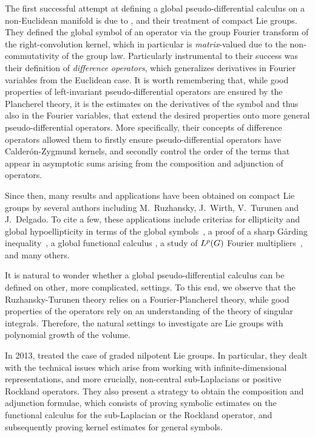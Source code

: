 The first successful attempt at defining a global pseudo-differential calculus
on a non-Euclidean manifold is due to \citeauthor{RuzhanskyTurunen10},
and their treatment of compact Lie groups.
They defined the global symbol of an operator via the group Fourier transform of the right-convolution kernel,
which in particular is  \emph{matrix}-valued
due to the non-commutativity of the group law.
Particularly instrumental to their success was their definition of \emph{difference operators},
which generalizes derivatives in Fourier variables from the Euclidean case.
It is worth remembering that,
while good properties of left-invariant pseudo-differential operators
are ensured by the Plancherel theory,
it is the estimates on the derivatives of the symbol and thus also in the Fourier variables,
that extend the desired properties onto more general pseudo-differential operators.
More specifically,
their concepts of difference operators allowed them to firstly ensure pseudo-differential operators
have Calder\'on-Zygmund kernels,
and secondly control the order of the terms that appear in asymptotic sums
arising from the composition and adjunction of operators.

Since then,
many results and applications have been obtained on compact Lie groups
by several authors including M.\ Ruzhansky, J.\ Wirth, V.\ Turunen and J.\ Delgado.
To cite a few,
these applications include
criterias for ellipticity and global hypoellipticity in terms of the global symbols~\cite{RuzhanskyTurunen10},
a proof of a sharp Gårding inequality~\cite{RuzhanskyTurunen11},
a global functional calculus \cite{RuzhanskyWirth14},
a study of ${L^{p} (G)}$ Fourier multipliers~\cite{RuzhanskyWirth15},
and many others.

It is natural to wonder whether a global pseudo-differential calculus can be defined on other,
more complicated, settings.
To this end,
we observe that the Ruzhansky-Turunen theory relies on a Fourier-Plancherel theory,
while good properties of the operators rely on an understanding of the theory of singular integrals.
Therefore,
the natural settings to investigate are Lie groups with polynomial growth of the volume.

In 2013,
\citeauthor{FischerRuzhansky12} treated the case of graded nilpotent Lie groups.
In particular,
they dealt with the technical issues which arise from working with infinite-dimensional representations,
and more crucially,
non-central sub-Laplacians or positive Rockland operators.
They also present a strategy to obtain the composition and adjunction formulae,
which consists of proving symbolic estimates on the functional calculus for the sub-Laplacian or the Rockland operator,
and subsequently proving kernel estimates for general symbols.

